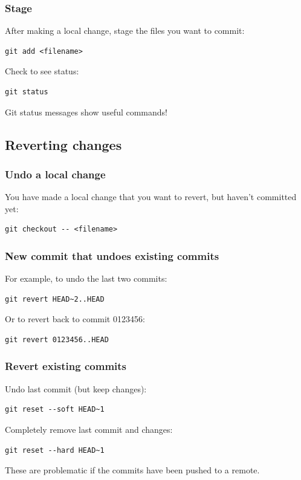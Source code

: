 \documentclass{beamer}
\begin{document}
\begin{frame}[fragile]
  \frametitle{Stage}
After making a local change, stage the files you want to commit:
  \begin{lstlisting}
git add <filename>
  \end{lstlisting}
Check to see status:
  \begin{lstlisting}
git status
  \end{lstlisting}
Git status messages show useful commands!
\end{frame}

\subsection{Reverting changes}
\begin{frame}[fragile]
  \frametitle{Undo a local change}
You have made a local change that you want to revert, but haven't committed yet:
  \begin{lstlisting}
git checkout -- <filename>
  \end{lstlisting}
\end{frame}

\begin{frame}[fragile]
  \frametitle{New commit that undoes existing commits}
For example, to undo the last two commits:
  \begin{lstlisting}
git revert HEAD~2..HEAD
  \end{lstlisting}
Or to revert back to commit 0123456:
  \begin{lstlisting}
git revert 0123456..HEAD
  \end{lstlisting}
\end{frame}

\begin{frame}[fragile]
  \frametitle{Revert existing commits}
Undo last commit (but keep changes):
  \begin{lstlisting}
git reset --soft HEAD~1
  \end{lstlisting}
Completely remove last commit and changes:
  \begin{lstlisting}
git reset --hard HEAD~1
  \end{lstlisting}
These are problematic if the commits have been pushed to a remote.
\end{frame}
\end{document}

